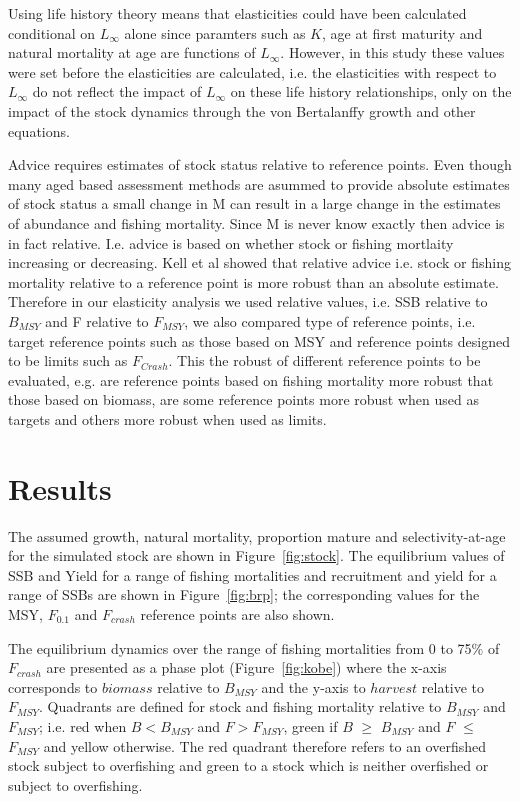 \documentclass{pnastwo}
\begin{document}
\begin{article}
Using life history theory means that elasticities could have been calculated conditional on $L_{\infty}$ alone since paramters such as $K$, age at first maturity 
and natural mortality at age are functions of $L_{\infty}$. However, in this study these values were set before the elasticities are calculated, i.e. the elasticities 
with respect to $L_{\infty}$ do not reflect the impact of $L_{\infty}$ on these life history relationships, only on the impact of the stock dynamics 
through the von Bertalanffy growth and other equations.  

Advice requires estimates of stock status relative to reference points. Even though many aged based assessment methods are asummed to provide absolute 
estimates of stock status a small change in M can result in a large change in the estimates of abundance and fishing mortality. Since M is never know 
exactly then advice is in fact relative. I.e. advice is based on whether stock or fishing mortlaity increasing or decreasing. Kell et al showed that relative advice i.e. 
stock or fishing mortality relative to a reference point is more robust than an absolute estimate. Therefore in our elasticity analysis we used relative 
values, i.e. SSB relative to $B_{MSY}$ and F relative to $F_{MSY}$, we also compared type of reference points, i.e. target reference points such as those 
based on MSY and reference points designed to be limits such as $F_{Crash}$. This the robust of different reference points to be evaluated, e.g. are reference points 
based on fishing mortality more robust that those based on biomass, are some reference points more robust when used as targets and others more robust 
when used as limits. 

\section*{Results}

The assumed growth, natural mortality, proportion mature and selectivity-at-age for the simulated stock are shown in Figure~\ref{fig:stock}. The 
equilibrium values of SSB and Yield for a range of fishing mortalities and recruitment and yield for a range of SSBs are shown in Figure~\ref{fig:brp}; 
the corresponding values for the MSY, $F_{0.1}$ and $F_{crash}$ reference points are also shown. 

The equilibrium dynamics over the range of fishing mortalities from 0 to 75\% of $F_{crash}$ are presented as a phase plot (Figure~\ref{fig:kobe})
where the x-axis corresponds to $biomass$ relative to $B_{MSY}$ and the y-axis to $harvest$ relative to $F_{MSY}$.
Quadrants are defined for stock and fishing mortality relative to $B_{MSY}$ and $F_{MSY}$; i.e. red when $B<B_{MSY}$ and $F>F_{MSY}$, green 
if $B$ $\geq$ $B_{MSY}$ and $F$ $\leq$ $F_{MSY}$ and yellow otherwise. The red quadrant therefore refers to an overfished stock subject to overfishing and  
green to a stock which is neither overfished or subject to overfishing.


\end{article}
\end{document}
